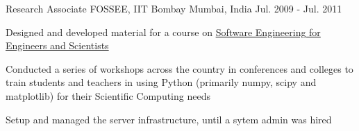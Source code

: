 \begin{cventries}
  \cventry
    {Research Associate} %
    {FOSSEE, IIT Bombay } %
    {Mumbai, India} %
    {Jul. 2009 - Jul. 2011} %
    {
      \begin{cvitems} %
        \item {Designed and developed material for a course on \href{https://github.com/FOSSEE/sees}{Software Engineering for Engineers and Scientists}}
        \item {Conducted a series of workshops across the country in conferences and colleges to train students and teachers in using Python (primarily numpy, scipy and matplotlib) for their Scientific Computing needs}
        \item {Setup and managed the server infrastructure, until a sytem admin was hired}
      \end{cvitems}
    }

\end{cventries}
